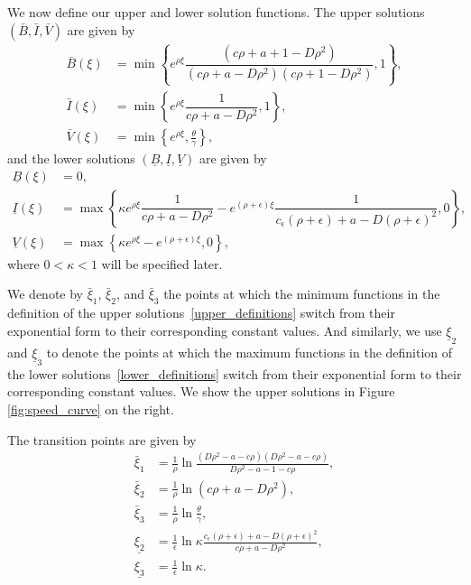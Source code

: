\documentclass[11pt]{article}
\theoremstyle{definition}
\begin{document}
We  now define our upper and lower solution functions.
The upper solutions $(\bar{B}, \bar{I},\bar{V})$ are given by
\begin{align} \label{upper_definitions} \nonumber
    \bar{B}(\xi)&= \min \left\{e^{\rho \xi} \dfrac{(c \rho+a+1-D \rho^2)}{(c \rho +a- D \rho^2)(c\rho +1- D\rho^2)},1\right\}, \\ \bar{I}(\xi)&= \min \left\{e^{\rho \xi}\dfrac{1}{c \rho +a - D \rho^2},1 \right\}, \\ \nonumber \bar{V}(\xi)&= \min\left\{e^{\rho \xi}, \frac{\theta}{\gamma}\right\},
\end{align}
and the lower solutions $(\underline{B},\underline{I},\underline{V})$ are given by
\begin{align} \label{lower_definitions} \nonumber
     \underline{B}(\xi)&= 0, \\ \underline{I}(\xi)&= \max \left\{\kappa e^{\rho \xi} \dfrac{1}{c \rho +a - D \rho^2}-e^{(\rho+ \epsilon)\xi}\dfrac{1}{c_\epsilon (\rho+\epsilon) +a - D (\rho+\epsilon)^2},0 \right\}, \\ \nonumber \underline{V}(\xi)&= \max \left\{\kappa e^{\rho \xi}-e^{(\rho+ \epsilon)\xi},0 \right\},
 \end{align}
where $0<\kappa<1$ will be specified later.

We denote by $\bar{\xi}_{1}$, $\bar{\xi}_{2}$, and $\bar{\xi}_{3}$ the points at which the minimum functions in the definition of the upper solutions~\eqref{upper_definitions} switch from their exponential form to their corresponding constant values.  And 
similarly, we use $\underline{\xi}_{2}$ and $\underline{\xi}_{3}$ to denote the points at which the maximum functions in the definition of the lower solutions~\eqref{lower_definitions} switch from their exponential form to their corresponding constant values. We show the upper solutions in Figure \ref{fig:speed_curve} on the right. 

 The transition points are given by
 \begin{align}
    \bar{\xi}_1&=\frac{1}{\rho} \ln {\frac{(D \rho^2 -a -c \rho)(D\rho^2 -a- c \rho)}{D \rho^2-a-1-c \rho} },\\\bar{\xi}_2&=\frac{1}{\rho} \ln{(c \rho +a - D \rho^2)}, \\ \bar{\xi}_3&=\frac{1}{\rho}\ln{\frac{\theta}{\gamma}}, \\ \underline{\xi_2}&= \frac{1} {\epsilon} \ln{\kappa\frac{c_\epsilon (\rho+\epsilon) +a - D (\rho+\epsilon)^2}{c \rho +a - D \rho^2}}, \\  \underline{\xi_3}&= \frac{1} {\epsilon} \ln{\kappa}.
\end{align}
\end{document}
